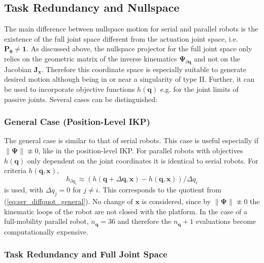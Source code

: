 \documentclass[a4paper,twoside]{article}
\begin{document}
\subsection{Task Redundancy and Nullspace}
\label{sec:nullspace_parrob}

 
The main difference between nullspace motion for serial and parallel robots is the existence of the full joint space different from the actuation joint space, i.e. $\bm{P}_{\bm{\theta}}\neq\bm{1}$. %
As discussed above, the nullspace projector for the full joint space only relies on the geometric matrix of the inverse kinematics $\bm{\Psi}_{\partial \bm{q}}$ and not on the Jacobian $\bm{J}_{\bm{x}}$.
Therefore this coordinate space is especially suitable to generate desired motion although being in or near a singularity of type II.
Further, it can be used to incorporate objective functions $h(\bm{q})$ e.g. for the joint limits of passive joints.
Several cases can be distinguished:

\subsubsection{General Case (Position-Level IKP)}


The general case is similar to that of serial robots. 
This case is useful especially if $\lVert\bm{\Psi}\rVert \not\approx 0$, like in the position-level IKP.
For parallel robots with objectives $h(\bm{q})$ only dependent on the joint coordinates it is identical to serial robots.
%
For criteria $h(\bm{q},\bm{x})$, 
\begin{equation}
h_{\partial q_i} \approx (h(\bm{q}+\Delta \bm{q},\bm{x}) - h(\bm{q},\bm{x}))/\Delta q_i
\end{equation}
is used, with $\Delta q_j = 0$ for $j \neq i$.
This corresponds to the quotient from (\ref{eq:ser_diffquot_general}).
No change of $\bm{x}$ is considered, since by $\lVert\bm{\Psi}\rVert \not\approx 0$ the kinematic loops of the robot are not closed with the platform.
In the case of a full-mobility parallel robot, $n_{\bm{q}}=36$ and therefore the $n_{\bm{q}}{+}1$ evaluations become computationally expensive.

\subsubsection{Task Redundancy and Full Joint Space}
\label{sec:parrob_taskred_fullspace}
\end{document}

